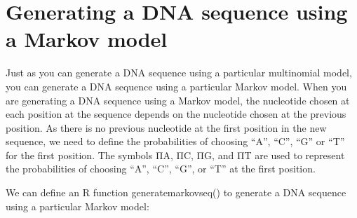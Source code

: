 \documentclass[
]{book}
\begin{document}
\hypertarget{generating-a-dna-sequence-using-a-markov-model}{%
\section{Generating a DNA sequence using a Markov model}\label{generating-a-dna-sequence-using-a-markov-model}}

Just as you can generate a DNA sequence using a particular multinomial model, you can generate a DNA sequence using a particular Markov model. When you are generating a DNA sequence using a Markov model, the nucleotide chosen at each position at the sequence depends on the nucleotide chosen at the previous position. As there is no previous nucleotide at the first position in the new sequence, we need to define the probabilities of choosing ``A'', ``C'', ``G'' or ``T'' for the first position. The symbols ΠA, ΠC, ΠG, and ΠT are used to represent the probabilities of choosing ``A'', ``C'', ``G'', or ``T'' at the first position.

We can define an R function generatemarkovseq() to generate a DNA sequence using a particular Markov model:
\end{document}
